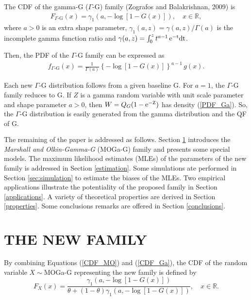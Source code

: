 \documentclass[twoside,leqno,11pt]{article}
\begin{document}
The CDF of the gamma-G ($\Gamma$-G) family (Zografos and Balakrishnan, 2009) is
\begin{eqnarray}\label{CDF_Ga}
F_{\Gamma\text{-G}}(x)=\gamma_1\left( a, -\log \left[1-G(x)\right]\right), \quad x \in \mathbb{R},
\end{eqnarray}
where $a>0$ is an extra shape parameter,  $\gamma_1(a,z)= \gamma(a,z)/\Gamma(a)$ is the incomplete gamma function ratio
and $\gamma(a,z)=\int_0^{z} t^{a-1}\,\rm{e}^{-t}dt$.

Then, the PDF of the $\Gamma$-G family can be expressed as
\begin{eqnarray}\label{PDF_Ga}
\displaystyle
f_{\Gamma\text{-G}}(x)=\frac{\displaystyle 1}{\displaystyle \Gamma(a)} \left\{ -\log[1-G(x)] \right\}^{a-1}\, g(x).
\end{eqnarray}

Each new $\Gamma$-G distribution follows from a given baseline G.
For $a=1$, the $\Gamma$-G family reduces to G.
If $Z$ is a gamma random variable with unit scale
parameter and shape parameter $a>0$, then $W=Q_G(1-\rm{e}^{-Z})$ has density (\ref{PDF_Ga}). So,
the $\Gamma$-G distribution is easily generated from the gamma distribution and the QF of G.

The remaining of the paper is addressed as follows. Section \ref{sec:MOGaG} introduces the {\it Marshall and Olkin-Gamma-G} (MOGa-G)
family and presents some special models. The maximum likelihood estimates (MLEs) of the parameters of the new family is addressed
in Section \ref{estimation}. Some simulations ate performed in Section \ref{sec:simulation} to estimate the biases of the MLEs. Two
empirical applications illustrate the potentiality of the proposed family in Section \ref{applications}. A variety of theoretical properties are derived
in Section \ref{properties}. Some conclusions remarks are offered in Section \ref{conclusions}.

\section{THE NEW FAMILY}\label{sec:MOGaG}

By combining Equations (\ref{CDF_MO}) and (\ref{CDF_Ga}), the CDF of the random variable $X\sim$MOGa-G
representing the new family is defined by
\begin{equation}\label{CDF_MO-Gamma-G}
F_{X}(x)=\frac{\gamma_1\left( a, -\log \left[1-G(x)\right]\right)}{\theta+(1-\theta)\gamma_1\left( a, -\log \left[1-G(x)\right]\right)},\quad x \in \mathbb{R}.
\end{equation}
\end{document}
